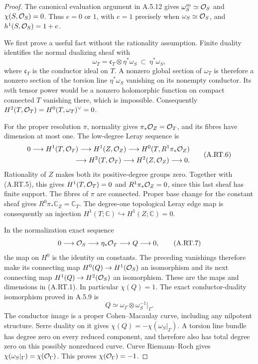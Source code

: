 \begin{proof}
The canonical evaluation argument in A.5.12 gives
$\omega_S^m\simeq\mathcal O_S$ and $\chi(S,\mathcal O_S)=0$.
Thus $e=0$ or $1$, with $e=1$ precisely when
$\omega_S\simeq\mathcal O_S$, and
$h^1(S,\mathcal O_S)=1+e$.

We first prove a useful fact without the rationality assumption.
Finite duality identifies the normal dualizing sheaf with
\[
 \omega_T=\mathfrak c_T\otimes\eta^*\omega_S
       \ \subset\ \eta^*\omega_S,
\tag{A.RT.5}
\]
where $\mathfrak c_T$ is the conductor ideal on $T$.
A nonzero global section of $\omega_T$ is therefore a nonzero
section of the torsion line $\eta^*\omega_S$ vanishing on its
nonempty conductor. Its $m$th tensor power would be a nonzero
holomorphic function on compact connected $T$ vanishing there,
which is impossible. Consequently
$H^2(T,\mathcal O_T)=H^0(T,\omega_T)^\vee=0$.

For the proper resolution $\pi$, normality gives
$\pi_*\mathcal O_Z=\mathcal O_T$, and its fibres have dimension at most one.
The low-degree Leray sequence is
\[
\begin{split}
0\longrightarrow H^1(T,\mathcal O_T)\longrightarrow H^1(Z,\mathcal O_Z)
 \longrightarrow H^0(T,R^1\pi_*\mathcal O_Z)\\
 \longrightarrow H^2(T,\mathcal O_T)\longrightarrow H^2(Z,\mathcal O_Z)
 \longrightarrow0.
\end{split}
\tag{A.RT.6}
\]
Rationality of $Z$ makes both its positive-degree groups zero.
Together with (A.RT.5), this gives $H^1(T,\mathcal O_T)=0$ and
$R^1\pi_*\mathcal O_Z=0$, since this last sheaf has finite support.
The fibres of $\pi$ are connected. Proper base change for the
constant sheaf gives $R^0\pi_*\mathbb C_Z=\mathbb C_T$.
The degree-one topological Leray edge map is consequently an
injection $H^1(T;\mathbb C)\hookrightarrow H^1(Z;\mathbb C)=0$.

In the normalization exact sequence
\[
 0\longrightarrow\mathcal O_S\longrightarrow\eta_*\mathcal O_T
       \longrightarrow Q\longrightarrow0,
\tag{A.RT.7}
\]
the map on $H^0$ is the identity on constants. The preceding
vanishings therefore make its connecting map
$H^0(Q)\to H^1(\mathcal O_S)$ an isomorphism and its next connecting
map $H^1(Q)\to H^2(\mathcal O_S)$ an isomorphism. These are the
maps and dimensions in (A.RT.1). In particular $\chi(Q)=1$.
The exact conductor-duality isomorphism proved in A.5.9 is
\[
 Q\simeq\omega_\Gamma\otimes\omega_S^{-1}|_\Gamma.
\tag{A.RT.8}
\]
The conductor image is a proper Cohen--Macaulay curve, including
any nilpotent structure. Serre duality on it gives
$\chi(Q)=-\chi(\omega_S|_\Gamma)$. A torsion line bundle has
degree zero on every reduced component, and therefore also has
total degree zero on this possibly nonreduced curve. Curve
Riemann--Roch gives
$\chi(\omega_S|_\Gamma)=\chi(\mathcal O_\Gamma)$.
This proves $\chi(\mathcal O_\Gamma)=-1$.


\end{proof}
